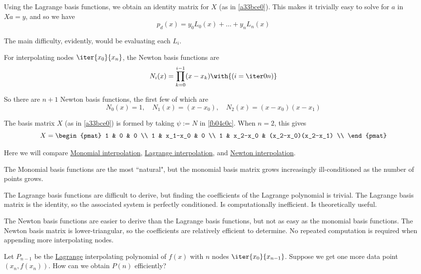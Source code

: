 Using the Lagrange basis functions, we obtain an identity matrix for $X$ (as in
\autoref{a33bce0}). This makes it trivially easy to solve for $a$ in $Xa=y$,
and so we have
$$
  p_d(x)=y_0L_0(x)+\ldots+y_nL_n(x)
$$

The main difficulty, evidently, would be evaluating each $L_i$.

\label{f61c57c}

For interpolating nodes $\iter{x_0}{x_n}$, the Newton basis functions are
$$
  N_i(x)=\prod_{k=0}^{i-1}(x-x_k)\with{(i=\iter0n)}
$$

So there are $n+1$ Newton basis functions, the first few of which are
$$
  N_0(x)=1,\quad N_1(x)=(x-x_0),\quad N_2(x)=(x-x_0)(x-x_1)
$$

The basis matrix $X$ (as in \autoref{a33bce0}) is formed by taking $\psi:=N$ in
\autoref{fb04c0c}. When $n=2$, this gives
$$
  X=\begin{pmat}
    1 & 0       & 0                  \\
    1 & x_1-x_0 & 0                  \\
    1 & x_2-x_0 & (x_2-x_0)(x_2-x_1) \\
  \end{pmat}
$$

\label{fd5b9cb}

Here we will compare \href{fd147c5}{Monomial interpolation},
\href{dda7795}{Lagrange interpolation}, and \href{f61c57c}{Newton
interpolation}.

The Monomial basis functions are the most ``natural", but the monomial basis
matrix grows increasingly ill-conditioned as the number of points grows.

The Lagrange basis functions are difficult to derive, but finding the
coefficients of the Lagrange polynomial is trivial. The Lagrange basis matrix
is the identity, so the associated system is perfectly conditioned. Is
computationally inefficient. Is theoretically useful.

The Newton basis functions are easier to derive than the Lagrange basis
functions, but not as easy as the monomial basis functions. The Newton basis
matrix is lower-triangular, so the coefficients are relatively efficient to
determine. No repeated computation is required when appending more
interpolating nodes.

\label{a1bdb85}

Let $P_{n-1}$ be the \href{dda7795}{Lagrange} interpolating polynomial of
$f(x)$ with $n$ nodes $\iter{x_0}{x_{n-1}}$. Suppose we get one more data point
$(x_n,f(x_n))$. How can we obtain $P(n)$ efficiently?

